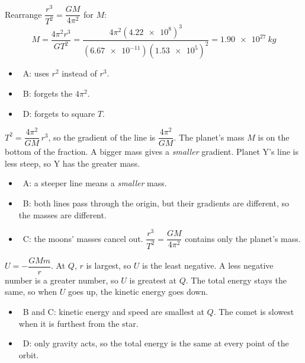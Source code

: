 \begin{practiceanswers}
\begin{practiceans}
  Rearrange $\dfrac{r^3}{T^2} = \dfrac{GM}{4\pi^2}$ for $M$:
  \[ M = \frac{4\pi^2 r^3}{GT^2}
       = \frac{4\pi^2 (\num{4.22e8})^3}{(\num{6.67e-11})(\num{1.53e5})^2}
       = \qty{1.90e27}{kg} \]
  \begin{itemize}
    \item \xmark\ A: uses $r^2$ instead of $r^3$.
    \item \xmark\ B: forgets the $4\pi^2$.
    \item \xmark\ D: forgets to square $T$.
  \end{itemize}
\end{practiceans}

\begin{practiceans}
  $T^2 = \dfrac{4\pi^2}{GM}\, r^3$, so the gradient of the line is $\dfrac{4\pi^2}{GM}$. The
  planet's mass $M$ is on the bottom of the fraction. A bigger mass gives a \emph{smaller}
  gradient. Planet Y's line is less steep, so Y has the greater mass.
  \begin{itemize}
    \item \xmark\ A: a steeper line means a \emph{smaller} mass.
    \item \xmark\ B: both lines pass through the origin, but their gradients are different, so the
          masses are different.
    \item \xmark\ C: the moons' masses cancel out. $\dfrac{r^3}{T^2} = \dfrac{GM}{4\pi^2}$ contains
          only the planet's mass.
  \end{itemize}
\end{practiceans}

\begin{practiceans}
  $U = -\dfrac{GMm}{r}$. At $Q$, $r$ is largest, so $U$ is the least negative. A less negative
  number is a greater number, so $U$ is greatest at $Q$. The total energy stays the same, so when
  $U$ goes up, the kinetic energy goes down.
  \begin{itemize}
    \item \xmark\ B and C: kinetic energy and speed are smallest at $Q$. The comet is slowest when it
          is furthest from the star.
    \item \xmark\ D: only gravity acts, so the total energy is the same at every point of the orbit.
  \end{itemize}
\end{practiceans}


\end{practiceanswers}
